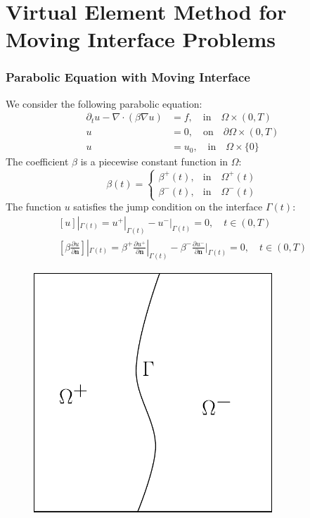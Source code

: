 \documentclass[notheorems,serif]{beamer}
\begin{document}
\begin{CJK}{UTF8}{gkai}
\section{}

\section{Virtual Element Method for Moving Interface Problems}
\begin{frame}
    \frametitle{Parabolic Equation with Moving Interface}
\begin{minipage}[b]{0.6\linewidth}
\small{
We consider the following parabolic equation:
$$
\begin{aligned}
    \partial_t u - \nabla \cdot (\beta \nabla u) & = f, \quad \text{in} \quad \Omega \times (0, T)\\
    u & = 0, \quad \text{on} \quad \partial \Omega \times (0, T)\\
    u & = u_0, \quad \text{in} \quad \Omega \times \{0\}
\end{aligned}
$$
The coefficient $\beta$ is a piecewise constant function in $\Omega$:
$$
\beta(t) = 
\begin{cases}
    \beta^+(t), & \text{in} \quad \Omega^+(t)\\
    \beta^-(t), & \text{in} \quad \Omega^-(t)
\end{cases}
$$
The function $u$ satisfies the jump condition
on the interface $\Gamma(t)$:
$$
\begin{aligned}
    [u]|_{\Gamma(t)} = u^+|_{\Gamma(t)} - u^-|_{\Gamma(t)} = 0, \quad t\in (0,
    T)\\
[\beta \frac{\partial u}{\partial \boldsymbol{n}}]|_{\Gamma(t)} =
\beta^+\frac{\partial u^+}{\partial \boldsymbol{n}}|_{\Gamma(t)}
-
\beta^-\frac{\partial u^-}{\partial \boldsymbol{n}}|_{\Gamma(t)} = 0, \quad t\in (0, T)
\end{aligned}
$$
}
\end{minipage}
\hfill
\begin{minipage}[b]{0.38\linewidth}
\centering
\begin{figure}[htpb]
    \centering
    \includegraphics[width=0.8\textwidth]{../figures/interface_prob.pdf}

\end{figure}
\end{minipage}
\end{frame}
\end{CJK}
\end{document}
